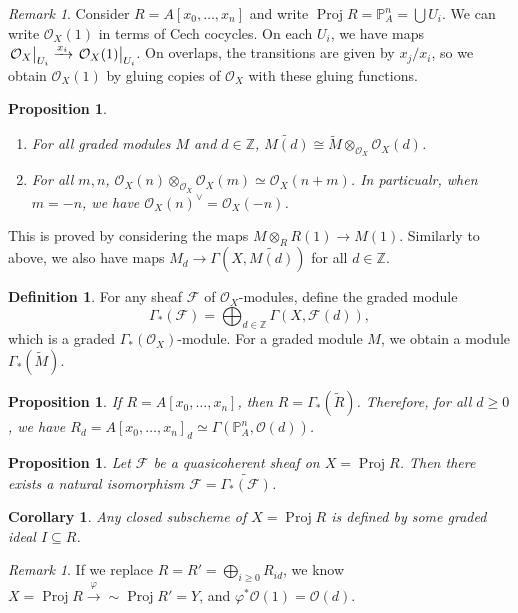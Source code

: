 \documentclass[leqno, openany]{memoir}
\newtheorem{cor}[thm]{Corollary}
\newtheorem{prop}[thm]{Proposition}
\theoremstyle{definition}
\newtheorem{defn}[thm]{Definition}
\theoremstyle{remark}
\newtheorem{rmk}[thm]{Remark}
\theoremstyle{plain}
\theoremstyle{definition}
\theoremstyle{remark}
\newcommand{\Z}{\mathbb{Z}}
\renewcommand{\P}{\mathbb{P}}
\newcommand{\mc}[1]{\mathcal{#1}}
\newcommand{\wt}[1]{\widetilde{#1}}
\DeclareMathOperator{\Proj}{Proj}
\begin{document}
\begin{rmk} Consider $R = A[x_0, \ldots, x_n]$ and write $\Proj R = \P^n_A =
    \bigcup U_i$. We can write $\mc{O}_X(1)$ in terms of Cech cocycles. On each
    $U_i$, we have maps $\eval{\mc{O}_X}_{U_i} \xrightarrow{x_i}
    \eval{\mc{O}_X(1)}_{U_i}$. On overlaps, the transitions are given by
    $x_j/x_i$, so we obtain $\mc{O}_X(1)$ by gluing copies of $\mc{O}_X$ with
    these gluing functions.  \end{rmk}

\begin{prop}\leavevmode \begin{enumerate} \item For all graded modules $M$ and
    $d \in \Z$, $\wt{M(d)} \cong \wt{M} \otimes_{\mc{O}_X} \mc{O}_X(d)$.  \item
    For all $m,n$, $\mc{O}_X(n) \otimes_{\mc{O}_X} \mc{O}_X(m) \simeq
    \mc{O}_X(n+m)$. In particualr, when $m = -n$, we have ${\mc{O}_X(n)}^{\vee}
    = \mc{O}_X(-n)$.  \end{enumerate} \end{prop}

This is proved by considering the maps $M \otimes_R R(1) \to M(1)$. Similarly
to above, we also have maps $M_d \to \Gamma(X, \wt{M(d)})$ for all $d \in \Z$.

\begin{defn} For any sheaf $\mc{F}$ of $\mc{O}_X$-modules, define the graded
    module \[ \Gamma_*(\mc{F}) = \bigoplus_{d \in \Z} \Gamma(X, \mc{F}(d)), \]
    which is a graded $\Gamma_*(\mc{O}_X)$-module. For a graded module $M$, we
    obtain a module $\Gamma_*(\wt{M})$.  \end{defn}

\begin{prop} If $R = A[x_0, \ldots, x_n]$, then $R = \Gamma_*(\wt{R})$.
Therefore, for all $d \geq 0$, we have $R_d = {A[x_0,\ldots,x_n]}_d \simeq
\Gamma(\P^n_A, \mc{O}(d))$.  \end{prop}

\begin{prop} Let $\mc{F}$ be a quasicoherent sheaf on $X = \Proj R$. Then there
exists a natural isomorphism $\mc{F} = \wt{\Gamma_*(\mc{F})}$.  \end{prop}

\begin{cor} Any closed subscheme of $X = \Proj R$ is defined by some graded
ideal $I \subseteq R$.  \end{cor}

\begin{rmk} If we replace $R = R' = \bigoplus_{i \geq 0} R_{id}$, we know $X =
\Proj R \xrightarrow{\varphi}{\sim} \Proj R' = Y$, and $\varphi^*\mc{O}(1) =
\mc{O}(d)$.  \end{rmk}
\end{document}
